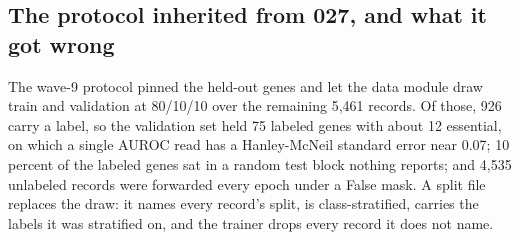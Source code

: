 

\subsection{The protocol inherited from 027, and what it got wrong}

The wave-9 protocol pinned the held-out genes and let the data module draw train and
validation at 80/10/10 over the remaining 5,461 records. Of those, 926 carry a label, so
the validation set held 75 labeled genes with about 12 essential, on which a single AUROC
read has a Hanley-McNeil standard error near 0.07; 10 percent of the labeled genes sat in
a random test block nothing reports; and 4,535 unlabeled records were forwarded every epoch
under a False mask. A split file replaces the draw: it names every record's split, is
class-stratified, carries the labels it was stratified on, and the trainer drops every
record it does not name.
